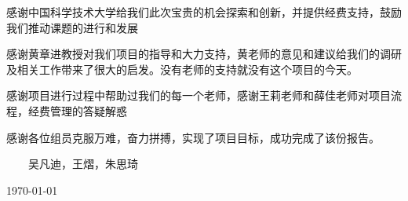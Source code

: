 
\begin{thanks}

感谢中国科学技术大学给我们此次宝贵的机会探索和创新，并提供经费支持，鼓励我们推动课题的进行和发展

感谢黄章进教授对我们项目的指导和大力支持，黄老师的意见和建议给我们的调研及相关工作带来了很大的启发。没有老师的支持就没有这个项目的今天。

感谢项目进行过程中帮助过我们的每一个老师，感谢王莉老师和薛佳老师对项目流程，经费管理的答疑解惑

感谢各位组员克服万难，奋力拼搏，实现了项目目标，成功完成了该份报告。

\begin{flushright}

~~~~吴凡迪，王熠，朱思琦~~~~

\today

\end{flushright}

\end{thanks}

